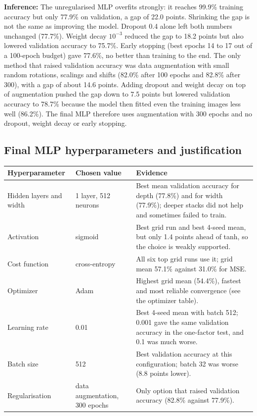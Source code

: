 \documentclass[12pt,a4paper]{article}
\begin{document}
\textbf{Inference:} The unregularised MLP overfits strongly: it reaches
99.9\% training accuracy but only
77.9\% on validation, a gap of 22.0
points. Shrinking the gap is not the same as improving the model. Dropout 0.4 alone left both
numbers unchanged (77.7\%). Weight decay $10^{-3}$ reduced the gap to
18.2 points but also lowered validation accuracy to
75.7\%. Early stopping (best epochs 14 to 17 out of a 100-epoch
budget) gave 77.6\%, no better than training to the
end. The only method that raised validation accuracy was data augmentation with small random
rotations, scalings and shifts (82.0\% after 100 epochs and
82.8\% after 300), with a gap of about
14.6 points. Adding dropout and weight decay on top of
augmentation pushed the gap down to 7.5
points but lowered validation accuracy to
78.7\% because the model
then fitted even the training images less well
(86.2\%). The final MLP
therefore uses augmentation with 300 epochs and no dropout, weight decay or early stopping.

\subsection*{Final MLP hyperparameters and justification}
\begin{longtable}{p{3.3cm}p{3.6cm}p{7.5cm}}
\toprule
Hyperparameter & Chosen value & Evidence \\
\midrule
Hidden layers and width & 1 layer, 512 neurons & Best mean validation accuracy for depth
(77.8\%) and for width (77.9\%); deeper stacks did not help
and sometimes failed to train. \\
Activation & sigmoid & Best grid run and best 4-seed mean, but only 1.4
points ahead of tanh, so the choice is weakly supported. \\
Cost function & cross-entropy & All six top grid runs use it; grid mean 57.1\%
against 31.0\% for MSE. \\
Optimizer & Adam & Highest grid mean (54.4\%), fastest and most reliable
convergence (see the optimizer table). \\
Learning rate & 0.01 & Best 4-seed mean with batch 512; 0.001 gave the same validation accuracy in the
one-factor test, and 0.1 was much worse. \\
Batch size & 512 & Best validation accuracy at this configuration; batch 32 was worse
(8.8 points lower). \\
Regularisation & data augmentation, 300 epochs & Only option that raised validation accuracy
(82.8\% against 77.9\%). \\
\bottomrule
\end{longtable}
\end{document}
